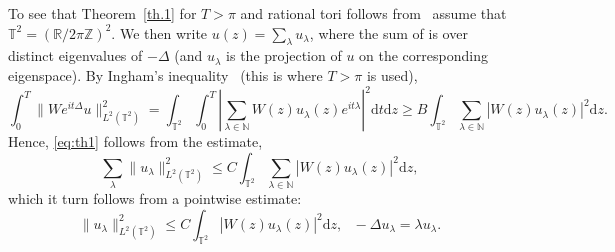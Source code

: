 \documentclass[11pt]{article}
\theoremstyle{definition}
\numberwithin{equation}{section}
\numberwithin{figure}{section}
\numberwithin{table}{section}
\newcommand{\NN}{{\mathbb N}}
\newcommand{\R}{{\mathbb R}}
\newcommand{\TT}{{\mathbb T}}
\newcommand{\ZZ}{{\mathbb Z}}
\newcommand*{\dd}{\mathrm{d}}
\newcommand*{\dz}{\dd z}
\newcommand*{\dt}{\dd t}
\begin{document}
To see that Theorem~\ref{th.1} for $ T > \pi $ and rational tori follows from~\cite[Theorem~1.2]{Jak} assume that $ \TT^2 = (\R/2\pi \ZZ)^2 $. We then write $ u (z) = \sum_{ \lambda } u_\lambda $, where the sum of is over distinct eigenvalues of $ - \Delta $ (and $u_\lambda$ is the projection of $u$ on the corresponding eigenspace). By Ingham's inequality~\cite{ing} (this is where $ T > \pi $ is used),
\[
\int_0^T \| W e^{ it \Delta} u \|^2_{ L^2 (\TT^2)} =
\int_{\TT^2 } \int_0^T \left| \sum_{ \lambda \in \NN } W(z) u_\lambda (z) e^{i t \lambda } \right|^2 \dt \dz \geq B
\int_{\TT^2} \sum_{ \lambda \in \NN } | W (z) u_\lambda (z) |^2 \dz.
\]
Hence, \eqref{eq:th1} follows from the estimate,
\begin{equation}\label{eq:Jak}
\sum_{ \lambda } \| u_\lambda\|^2_{L^2 (\TT^2) } \leq C \int_{\TT^2} \sum_{ \lambda \in \NN } | W (z) u_\lambda (z) |^2 \dz,
\end{equation}
which it turn follows from a pointwise estimate:
\begin{equation}\label{eq:Jak1}
\| u_\lambda\|^2_{L^2 (\TT^2) } \leq C \int_{\TT^2} | W (z) u_\lambda (z) |^2 \dz, \ \ \ - \Delta u_\lambda = \lambda u_\lambda.
\end{equation}
\end{document}
